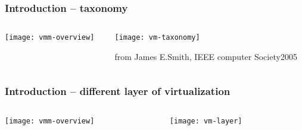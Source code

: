 \begin{frame}%
	\frametitle{Introduction -- taxonomy}



	\begin{columns}

	\begin{column}{.3\textwidth}
	
	\texttt{[image: vmm-overview]}
	
	\end{column}

	\begin{column}{.7\textwidth}
	

	\texttt{[image: vm-taxonomy]}
	
	\tiny	
	from James E.Smith,     IEEE computer Society2005	
	\end{column}
	
    
\end{columns}


\end{frame}

\begin{frame}%
	\frametitle{Introduction -- different layer of virtualization}
	
	
	
	\begin{columns}
		
		\begin{column}{.3\textwidth}
			
			\texttt{[image: vmm-overview]}
			
		\end{column}
		
		\begin{column}{.5\textwidth}
			
			
			\texttt{[image: vm-layer]}
			
			
		\end{column}
		
		
	\end{columns}
	
	
\end{frame}


